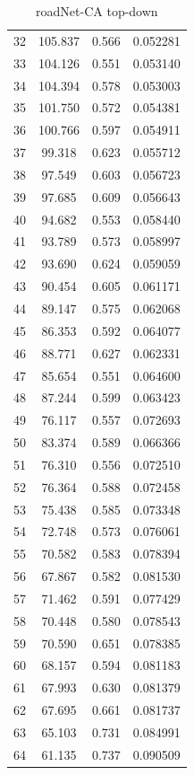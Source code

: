 \documentclass[10pt,twocolumn,letterpaper]{article}
\begin{document}
\begin{table}[h]
\begin{tabular}{@{}c|ccc@{}}
32 & 105.837 & 0.566 & 0.052281 \\
33 & 104.126 & 0.551 & 0.053140 \\
34 & 104.394 & 0.578 & 0.053003 \\
35 & 101.750 & 0.572 & 0.054381 \\
36 & 100.766 & 0.597 & 0.054911 \\
37 & 99.318 & 0.623 & 0.055712 \\
38 & 97.549 & 0.603 & 0.056723 \\
39 & 97.685 & 0.609 & 0.056643 \\
40 & 94.682 & 0.553 & 0.058440 \\
41 & 93.789 & 0.573 & 0.058997 \\
42 & 93.690 & 0.624 & 0.059059 \\
43 & 90.454 & 0.605 & 0.061171 \\
44 & 89.147 & 0.575 & 0.062068 \\
45 & 86.353 & 0.592 & 0.064077 \\
46 & 88.771 & 0.627 & 0.062331 \\
47 & 85.654 & 0.551 & 0.064600 \\
48 & 87.244 & 0.599 & 0.063423 \\
49 & 76.117 & 0.557 & 0.072693 \\
50 & 83.374 & 0.589 & 0.066366 \\
51 & 76.310 & 0.556 & 0.072510 \\
52 & 76.364 & 0.588 & 0.072458 \\
53 & 75.438 & 0.585 & 0.073348 \\
54 & 72.748 & 0.573 & 0.076061 \\
55 & 70.582 & 0.583 & 0.078394 \\
56 & 67.867 & 0.582 & 0.081530 \\
57 & 71.462 & 0.591 & 0.077429 \\
58 & 70.448 & 0.580 & 0.078543 \\
59 & 70.590 & 0.651 & 0.078385 \\
60 & 68.157 & 0.594 & 0.081183 \\
61 & 67.993 & 0.630 & 0.081379 \\
62 & 67.695 & 0.661 & 0.081737 \\
63 & 65.103 & 0.731 & 0.084991 \\
64 & 61.135 & 0.737 & 0.090509 \\
\bottomrule
\end{tabular}
\caption{roadNet-CA top-down}
\end{table}
\end{document}
